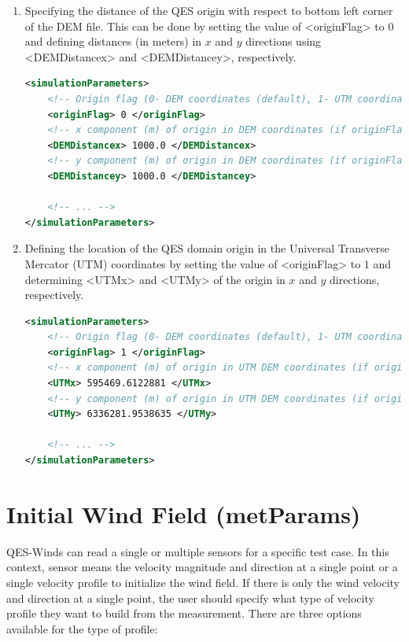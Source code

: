 \begin{enumerate}
\item Specifying the distance of the QES origin with respect to bottom left corner of the DEM file. This can be done by setting the value of <originFlag> to $0$ and defining distances (in meters) in $x$ and $y$ directions using <DEMDistancex> and <DEMDistancey>, respectively.

\begin{lstlisting}[language=XML]
<simulationParameters>
	<!-- Origin flag (0- DEM coordinates (default), 1- UTM coordinates) -->
	<originFlag> 0 </originFlag>
	<!-- x component (m) of origin in DEM coordinates (if originFlag = 0) -->
	<DEMDistancex> 1000.0 </DEMDistancex>
	<!-- y component (m) of origin in DEM coordinates (if originFlag = 0) -->
	<DEMDistancey> 1000.0 </DEMDistancey>
	
	<!-- ... -->
</simulationParameters>
\end{lstlisting}

\item Defining the location of the QES domain origin in the Universal Transverse Mercator (UTM) coordinates by setting the value of <originFlag> to $1$ and determining <UTMx> and <UTMy> of the origin in $x$ and $y$ directions, respectively.

\begin{lstlisting}[language=XML]
<simulationParameters>
	<!-- Origin flag (0- DEM coordinates (default), 1- UTM coordinates) -->
	<originFlag> 1 </originFlag>
	<!-- x component (m) of origin in UTM DEM coordinates (if originFlag = 1)-->
	<UTMx> 595469.6122881 </UTMx>
	<!-- y component (m) of origin in UTM DEM coordinates (if originFlag = 1)-->
	<UTMy> 6336281.9538635 </UTMy>
	
	<!-- ... -->
</simulationParameters>
\end{lstlisting}

\end{enumerate}


\section{Initial Wind Field (metParams)}

QES-Winds can read a single or multiple sensors for a specific test case. In this context, sensor means the velocity magnitude and direction at a single point or a single velocity profile to initialize the wind field. If there is only the wind velocity and direction at a single point, the user should specify what type of velocity profile they want to build from the measurement. There are three options available for the type of profile:

